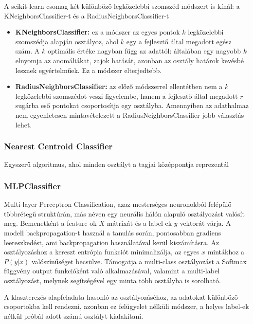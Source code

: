A scikit-learn csomag két különböző legközelebbi szomszéd módszert is kínál: a KNeighborsClassifier-t és a RadiusNeighborsClassifier-t

\begin{itemize}
	\item \textbf{KNeighborsClassifier:} ez a módszer az egyes pontok $k$ legközelebbi szomszédja alapján osztályoz, ahol $k$ egy a fejlesztő által megadott egész szám. A $k$ optimális értéke nagyban függ az adattól: általában egy nagyobb $k$ elnyomja az anomáliákat, zajok hatását, azonban az osztály határok kevésbé lesznek egyértelműek. Ez a módszer elterjedtebb.  
	
	\item \textbf{RadiusNeighborsClassifier:} az előző módszerrel ellentétben nem a $k$ legközelebbi szomszédot veszi figyelembe, hanem a fejlesztő által megadott $r$ sugárba eső pontokat csoportosítja egy osztályba. Amennyiben az adathalmaz nem egyenletesen mintavételezett a RadiusNeighborsClassifier jobb választás lehet.
\end{itemize}

\subsubsection{Nearest Centroid Classifier}
Egyszerű algoritmus, ahol minden osztályt a tagjai középpontja reprezentál

\subsubsection{MLPClassifier}
Multi-layer Perceptron Classification, azaz mesterséges neuronokból felépülő többrétegű struktúrán, más néven egy neurális hálón alapuló osztályozást valósít meg. Bemenetként a feature-ok $X$ mátrixát és a label-ek $y$ vektorát várja. A modell backpropagation-t használ a tanulás során, pontosabban gradiens leereszkedést, ami backpropagation használatával kerül kiszámításra. Az osztályozáshoz a kereszt entrópia funkciót minimalizálja, az egyes $x$ mintákhoz a $P(y|x)$ valószínűséget becsülve. Támogatja a  multi-class osztályozást a Softmax függvény output funkcióként való alkalmazásával, valamint a multi-label osztályozást, melynek segítségével egy minta több osztályba is sorolható.


 \label{ssec:klaszterezes}
A klaszterezés alapfeladata hasonló az osztályozáséhoz, az adatokat különböző csoportokba kell rendezni, azonban ez felügyelet nélküli módszer, a helyes label-ek nélkül próbál adott számú osztályt kialakítani. 
